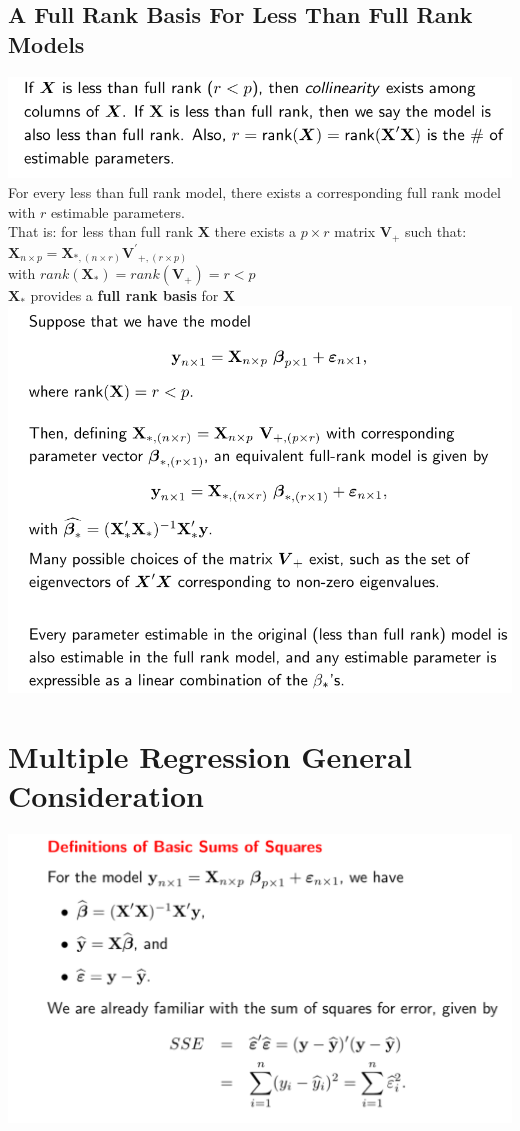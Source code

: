 \documentclass[openany]{book}
\newcommand{\bmx}{\bm{X}}
\numberwithin{equation}{section}
\begin{document}
\begin{flushleft}
\section{A Full Rank Basis For Less Than Full Rank Models}
\includegraphics[scale=.5]{col.png}\\
For every less than full rank model, there exists a corresponding full rank model with $r$ estimable parameters.\\
That is: for less than full rank $\bm{X}$ there exists a $p\times r$ matrix $\bm{V}_{+}$ such that:\\
$\bm{X}_{n\times p}=\bm{X}_{*,(n\times r)}\bm{V^{'}}_{+,(r\times p)}$\\
with $rank(\bm{X}_*)=rank(\bm{V_{+}})=r<p$\\
$\bmx_*$ provides a \textbf{full rank basis} for $\bmx$\\
\includegraphics[scale=.5]{frb.png}\\
\chapter{Multiple Regression General Consideration}
\includegraphics[scale=.55]{ss.png}\\
\end{flushleft}
\end{document}
